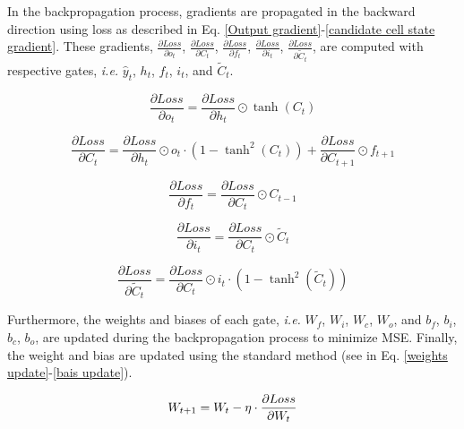 \documentclass[journal]{IEEEtran}
\begin{document}
In the backpropagation process, gradients are propagated in the backward direction using loss as described in Eq. \eqref{Output gradient}-\eqref{candidate cell state gradient}. These gradients, $\frac{\partial Loss}{\partial o_t}$, $\frac{\partial Loss}{\partial C_t}$, $\frac{\partial Loss}{\partial f_t}$, $\frac{\partial Loss}{\partial i_t}$, $\frac{\partial Loss}{\partial \tilde{C}_t}$, are computed with respective gates, \textit{i.e.} $\hat{y}_t$, $h_t$, $f_t$, $i_t$, and $\tilde{C}_t$.


\begin{equation}\label{Output gradient}
    \frac{\partial Loss}{\partial o_t} = \frac{\partial Loss}{\partial h_t} \odot \tanh(C_t)
\end{equation}



\begin{equation}\label{cell state gradient}
    \frac{\partial Loss}{\partial C_t} = \frac{\partial Loss}{\partial h_t} \odot o_t \cdot (1 - \tanh^2(C_t)) + \frac{\partial Loss}{\partial C_{t+1}} \odot f_{t+1}
\end{equation}

\begin{equation}\label{forget gate gradient}
    \frac{\partial Loss}{\partial f_t} = \frac{\partial Loss}{\partial C_t} \odot C_{t-1}
\end{equation}

\begin{equation}\label{input gate gradient}
    \frac{\partial Loss}{\partial i_t} = \frac{\partial Loss}{\partial C_t} \odot \tilde{C}_t
\end{equation}


\begin{equation}\label{candidate cell state gradient}
    \frac{\partial Loss}{\partial \tilde{C}_t} = \frac{\partial Loss}{\partial C_t} \odot i_t \cdot (1 - \tanh^2(\tilde{C}_t))
\end{equation}

Furthermore, the weights and biases of each gate, \textit{i.e.} $W_f$, $W_i$, $W_c$, $W_o$, and $b_f$, $b_i$, $b_c$, $b_o$, are updated during the backpropagation process to minimize MSE. Finally, the weight and bias are updated using the standard method (see in Eq. \ref{weights update}-\ref{bais update}).

\begin{equation}\label{weights update}
\normalsize
    W_{t+1} = W_t - \eta \cdot \frac{\partial Loss}{\partial W_t}
\end{equation}
\end{document}
